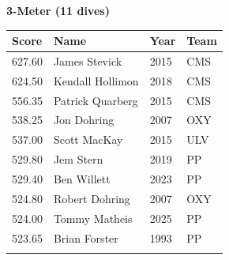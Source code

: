 \vspace{1.2em}
\noindent\begin{minipage}[t]{0.98\textwidth}
\centering
\textbf{\textcolor{teamprimary}{3-Meter (11 dives)}}\par
\vspace{0.5em}
\centering
\small
\renewcommand{\arraystretch}{1.0}
\setlength{\tabcolsep}{4pt}
\begin{tabular}{@{}p{2.5cm}p{4.5cm}p{1.5cm}p{2.5cm}@{}}
\toprule
\textbf{Score} & \textbf{Name} & \textbf{Year} & \textbf{Team} \\
\midrule
627.60 & James Stevick & 2015 & CMS \\
624.50 & Kendall Hollimon & 2018 & CMS \\
556.35 & Patrick Quarberg & 2015 & CMS \\
538.25 & Jon Dohring & 2007 & OXY \\
537.00 & Scott MacKay & 2015 & ULV \\
529.80 & Jem Stern & 2019 & PP \\
529.40 & Ben Willett & 2023 & PP \\
524.80 & Robert Dohring & 2007 & OXY \\
524.00 & Tommy Matheis & 2025 & PP \\
523.65 & Brian Forster & 1993 & PP \\
\bottomrule
\vspace{0.5em}
\end{tabular}
\end{minipage}